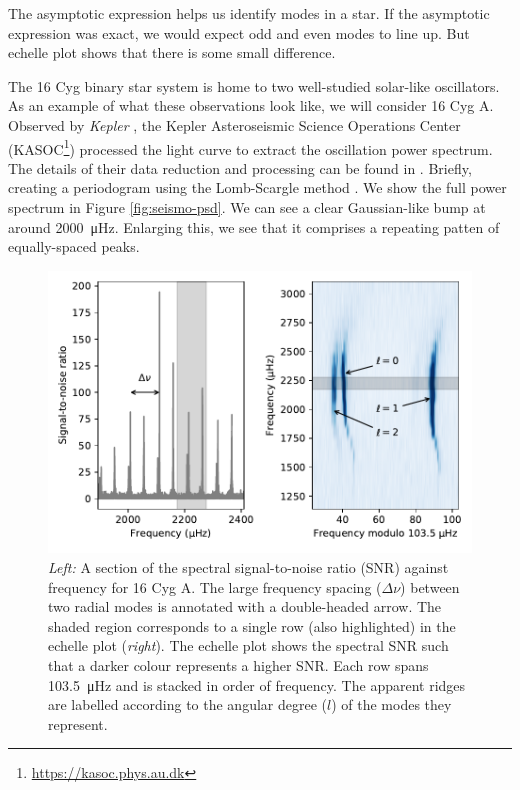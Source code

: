 The asymptotic expression helps us identify modes in a star. If the asymptotic expression was exact, we would expect odd and even modes to line up. But echelle plot shows that there is some small difference.

The 16 Cyg binary star system is home to two well-studied solar-like oscillators. As an example of what these observations look like, we will consider 16 Cyg A. Observed by \emph{Kepler} , the Kepler Asteroseismic Science Operations Center (KASOC\footnote{\url{https://kasoc.phys.au.dk}}) processed the light curve to extract the oscillation power spectrum. The details of their data reduction and processing can be found in \needcite. Briefly, creating a periodogram using the Lomb-Scargle method \citep{Lomb1976,Scargle1982}. We show the full power spectrum in Figure \ref{fig:seismo-psd}. We can see a clear Gaussian-like bump at around \SI{2000}{\micro\hertz}. Enlarging this, we see that it comprises a repeating patten of equally-spaced peaks.

\begin{figure}[tb]
    \centering
    \includegraphics{figures/seismo-echelle.pdf}
    \caption{\emph{Left:} A section of the spectral signal-to-noise ratio (SNR) against frequency for 16 Cyg A. The large frequency spacing (\(\Delta\nu\)) between two radial modes is annotated with a double-headed arrow. The shaded region corresponds to a single row (also highlighted) in the echelle plot (\emph{right}). The echelle plot shows the spectral SNR such that a darker colour represents a higher SNR. Each row spans \SI{103.5}{\micro\hertz} and is stacked in order of frequency. The apparent ridges are labelled according to the angular degree (\(l\)) of the modes they represent.}
    \label{fig:seismo-echelle}
\end{figure}

